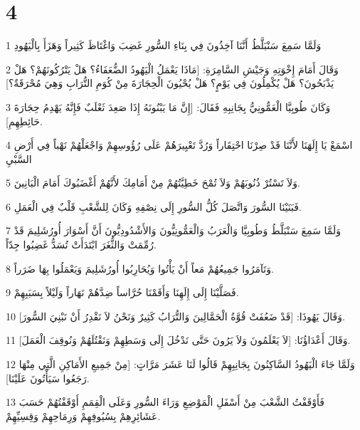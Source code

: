 \chapter{4}

\par 1 وَلَمَّا سَمِعَ سَنْبَلَّطُ أَنَّنَا آخِذُونَ فِي بِنَاءِ السُّورِ غَضِبَ وَاغْتَاظَ كَثِيراً وَهَزَأَ بِالْيَهُودِ
\par 2 وَقَالَ أَمَامَ إِخْوَتِهِ وَجَيْشِ السَّامِرَةِ: [مَاذَا يَعْمَلُ الْيَهُودُ الضُّعَفَاءُ؟ هَلْ يَتْرُكُونَهُمْ؟ هَلْ يَذْبَحُونَ؟ هَلْ يُكْمِلُونَ فِي يَوْمٍ؟ هَلْ يُحْيُونَ الْحِجَارَةَ مِنْ كُوَمِ التُّرَابِ وَهِيَ مُحْرَقَةٌ؟]
\par 3 وَكَانَ طُوبِيَّا الْعَمُّونِيُّ بِجَانِبِهِ فَقَالَ: [إِنَّ مَا يَبْنُونَهُ إِذَا صَعِدَ ثَعْلَبٌ فَإِنَّهُ يَهْدِمُ حِجَارَةَ حَائِطِهِمِ].
\par 4 اسْمَعْ يَا إِلَهَنَا لأَنَّنَا قَدْ صِرْنَا احْتِقَاراً وَرُدَّ تَعْيِيرَهُمْ عَلَى رُؤُوسِهِمْ وَاجْعَلْهُمْ نَهْباً فِي أَرْضِ السَّبْيِ
\par 5 وَلاَ تَسْتُرْ ذُنُوبَهُمْ وَلاَ تُمْحَ خَطِيَّتُهُمْ مِنْ أَمَامِكَ لأَنَّهُمْ أَغْضَبُوكَ أَمَامَ الْبَانِينَ.
\par 6 فَبَنَيْنَا السُّورَ وَاتَّصَلَ كُلُّ السُّورِ إِلَى نِصْفِهِ وَكَانَ لِلشَّعْبِ قَلْبٌ فِي الْعَمَلِ.
\par 7 وَلَمَّا سَمِعَ سَنْبَلَّطُ وَطُوبِيَّا وَالْعَرَبُ وَالْعَمُّونِيُّونَ وَالأَشْدُودِيُّونَ أَنَّ أَسْوَارَ أُورُشَلِيمَ قَدْ رُمِّمَتْ وَالثُّغَرَ ابْتَدَأَتْ تُسَدُّ غَضِبُوا جِدّاً.
\par 8 وَتَآمَرُوا جَمِيعُهُمْ مَعاً أَنْ يَأْتُوا وَيُحَارِبُوا أُورُشَلِيمَ وَيَعْمَلُوا بِهَا ضَرَراً.
\par 9 فَصَلَّيْنَا إِلَى إِلَهِنَا وَأَقَمْنَا حُرَّاساً ضِدَّهُمْ نَهَاراً وَلَيْلاً بِسَبَبِهِمْ.
\par 10 وَقَالَ يَهُوذَا: [قَدْ ضَعُفَتْ قُوَّةُ الْحَمَّالِينَ وَالتُّرَابُ كَثِيرٌ وَنَحْنُ لاَ نَقْدِرُ أَنْ نَبْنِيَ السُّورَ].
\par 11 وَقَالَ أَعْدَاؤُنَا: [لاَ يَعْلَمُونَ وَلاَ يَرُونَ حَتَّى نَدْخُلَ إِلَى وَسَطِهِمْ وَنَقْتُلَهُمْ وَنُوقِفَ الْعَمَلَ].
\par 12 وَلَمَّا جَاءَ الْيَهُودُ السَّاكِنُونَ بِجَانِبِهِمْ قَالُوا لَنَا عَشَرَ مَرَّاتٍ: [مِنْ جَمِيعِ الأَمَاكِنِ الَّتِي مِنْهَا رَجَعُوا سَيَأْتُونَ عَلَيْنَا].
\par 13 فَأَوْقَفْتُ الشَّعْبَ مِنْ أَسْفَلِ الْمَوْضِعِ وَرَاءَ السُّورِ وَعَلَى الْقِمَمِ أَوْقَفْتُهُمْ حَسَبَ عَشَائِرِهِمْ بِسُيُوفِهِمْ وَرِمَاحِهِمْ وَقِسِيِّهِمْ.
